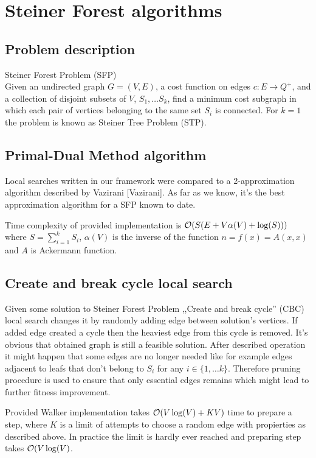 \chapter{Steiner Forest algorithms}

\section{Problem description}
Steiner Forest Problem (SFP)\\
Given an undirected graph $G = (V, E)$, a cost function on edges $c : E \rightarrow Q^+$, and a collection of disjoint subsets of $V$, $S_1, \dots S_k$, find a minimum cost subgraph in which each pair of vertices belonging to the same set $S_i$ is connected.
For $k = 1$ the problem is known as Steiner Tree Problem (STP).

\section{Primal-Dual Method algorithm}
Local searches written in our framework were compared to a 2-approximation algorithm described by Vazirani [Vazirani]. As far as we know, it's the best approximation algorithm for a SFP known to date.

Time complexity of provided implementation is $\mathcal{O}(S(E + V\alpha(V) + \log(S)))$ where $S = \sum_{i = 1}^{k}S_i$, $\alpha(V)$ is the inverse of the function $n = f(x) = A(x, x)$ and $A$ is Ackermann function.

\section{Create and break cycle local search}
Given some solution to Steiner Forest Problem ,,Create and break cycle'' (CBC) local search changes it by randomly adding edge between solution's vertices. If added edge created a cycle then the heaviest edge from this cycle is removed. It's obvious that obtained graph is still a feasible solution. After described operation it might happen that some edges are no longer needed like for example edges adjacent to leafs that don't belong to $S_i$ for any $i \in \{1, \dots k\}$. Therefore pruning procedure is used to ensure that only essential edges remains which might lead to further fitness improvement.

Provided Walker implementation takes $\mathcal{O}(V\log(V) + KV)$ time to prepare a step, where $K$ is a limit of attempts to choose a random edge with propierties as described above. In practice the limit is hardly ever reached and preparing step takes $\mathcal{O}(V\log(V)$.

